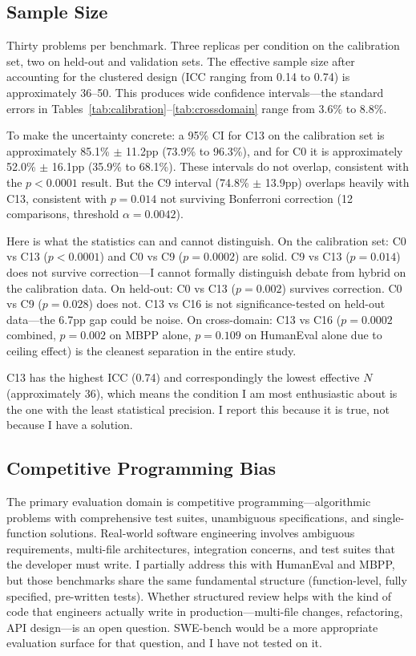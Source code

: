 \documentclass{article}
\begin{document}
\subsection{Sample Size}

Thirty problems per benchmark. Three replicas per condition on the calibration set, two on held-out and validation sets. The effective sample size after accounting for the clustered design (ICC ranging from 0.14 to 0.74) is approximately 36--50. This produces wide confidence intervals---the standard errors in Tables~\ref{tab:calibration}--\ref{tab:crossdomain} range from 3.6\% to 8.8\%.

To make the uncertainty concrete: a 95\% CI for C13 on the calibration set is approximately 85.1\% $\pm$ 11.2pp (73.9\% to 96.3\%), and for C0 it is approximately 52.0\% $\pm$ 16.1pp (35.9\% to 68.1\%). These intervals do not overlap, consistent with the $p<0.0001$ result. But the C9 interval (74.8\% $\pm$ 13.9pp) overlaps heavily with C13, consistent with $p=0.014$ not surviving Bonferroni correction (12 comparisons, threshold $\alpha=0.0042$).

Here is what the statistics can and cannot distinguish. On the calibration set: C0 vs C13 ($p<0.0001$) and C0 vs C9 ($p=0.0002$) are solid. C9 vs C13 ($p=0.014$) does not survive correction---I cannot formally distinguish debate from hybrid on the calibration data. On held-out: C0 vs C13 ($p=0.002$) survives correction. C0 vs C9 ($p=0.028$) does not. C13 vs C16 is not significance-tested on held-out data---the 6.7pp gap could be noise. On cross-domain: C13 vs C16 ($p=0.0002$ combined, $p=0.002$ on MBPP alone, $p=0.109$ on HumanEval alone due to ceiling effect) is the cleanest separation in the entire study.

C13 has the highest ICC (0.74) and correspondingly the lowest effective $N$ (approximately 36), which means the condition I am most enthusiastic about is the one with the least statistical precision. I report this because it is true, not because I have a solution.

\subsection{Competitive Programming Bias}

The primary evaluation domain is competitive programming---algorithmic problems with comprehensive test suites, unambiguous specifications, and single-function solutions. Real-world software engineering involves ambiguous requirements, multi-file architectures, integration concerns, and test suites that the developer must write. I partially address this with HumanEval and MBPP, but those benchmarks share the same fundamental structure (function-level, fully specified, pre-written tests). Whether structured review helps with the kind of code that engineers actually write in production---multi-file changes, refactoring, API design---is an open question. SWE-bench \citep{jimenez2024swebench} would be a more appropriate evaluation surface for that question, and I have not tested on it.
\end{document}

